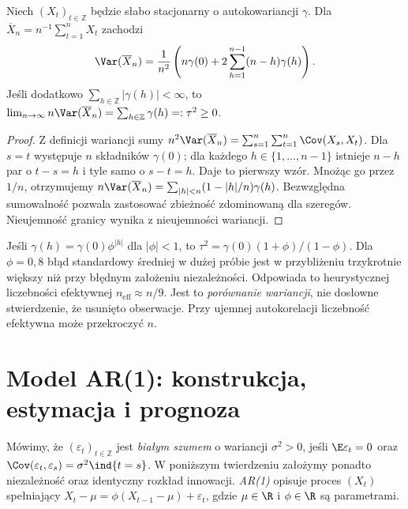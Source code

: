 \begin{twierdzenie}
\label{thm:mean-time-variance}
Niech $(X_t)_{t\in\mathbb Z}$ będzie słabo stacjonarny
o autokowariancji $\gamma$. Dla
$\overline X_n=n^{-1}\sum_{t=1}^nX_t$ zachodzi
\[
 \Var(\overline X_n)=\frac1{n^2}
 \left(n\gamma(0)+2\sum_{h=1}^{n-1}(n-h)\gamma(h)\right).
\]
Jeśli dodatkowo $\sum_{h\in\mathbb Z}|\gamma(h)|<\infty$,
to
$\lim_{n\to\infty}n\Var(\overline X_n)
=\sum_{h\in\mathbb Z}\gamma(h)=:\tau^2\ge0$.
\end{twierdzenie}
\begin{proof}
Z definicji wariancji sumy
$n^2\Var(\overline X_n)=\sum_{s=1}^n\sum_{t=1}^n
\Cov(X_s,X_t)$. Dla $s=t$ występuje $n$ składników
$\gamma(0)$; dla każdego $h\in\{1,\ldots,n-1\}$
istnieje $n-h$ par o $t-s=h$ i tyle samo o $s-t=h$.
Daje to pierwszy wzór. Mnożąc go przez $1/n$,
otrzymujemy
$n\Var(\overline X_n)=\sum_{|h|<n}
(1-|h|/n)\gamma(h)$. Bezwzględna sumowalność
pozwala zastosować zbieżność zdominowaną dla szeregów.
Nieujemność granicy wynika z nieujemności wariancji.
\end{proof}

\begin{przyklad}
Jeśli $\gamma(h)=\gamma(0)\phi^{|h|}$ dla $|\phi|<1$,
to $\tau^2=\gamma(0)(1+\phi)/(1-\phi)$.
Dla $\phi=0{,}8$ błąd standardowy średniej w dużej próbie
jest w przybliżeniu trzykrotnie większy niż przy błędnym
założeniu niezależności. Odpowiada to heurystycznej
liczebności efektywnej $n_{\mathrm{eff}}\approx n/9$.
Jest to \emph{porównanie wariancji}, nie dosłowne
stwierdzenie, że usunięto obserwacje. Przy ujemnej
autokorelacji liczebność efektywna może przekroczyć $n$.
\end{przyklad}

\section{Model AR(1): konstrukcja, estymacja i prognoza}
\begin{definicja}
Mówimy, że $(\varepsilon_t)_{t\in\mathbb Z}$ jest
\emph{białym szumem} o wariancji $\sigma^2>0$, jeśli
$\E\varepsilon_t=0$ oraz
$\Cov(\varepsilon_t,\varepsilon_s)=\sigma^2\ind{t=s}$.
W poniższym twierdzeniu założymy ponadto niezależność
oraz identyczny rozkład innowacji. \emph{AR(1)} opisuje
proces $(X_t)$ spełniający
$X_t-\mu=\phi(X_{t-1}-\mu)+\varepsilon_t$,
gdzie $\mu\in\R$ i $\phi\in\R$ są parametrami.
\end{definicja}

